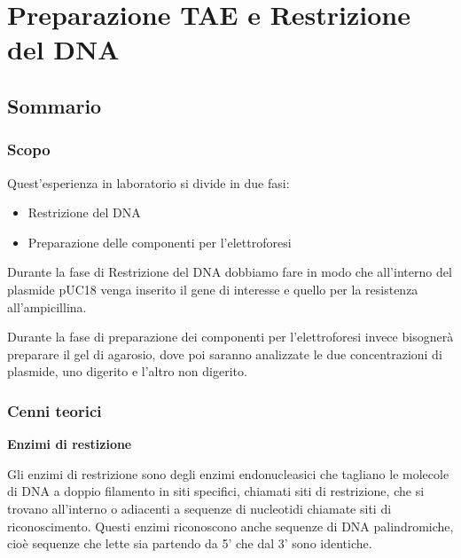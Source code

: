 \chapter{Preparazione TAE e Restrizione del DNA}

\vspace{0.6cm}


\section{Sommario}

\subsection{Scopo}

Quest'esperienza in laboratorio si divide in due fasi:

\begin{itemize}

	\item Restrizione del DNA

	\item Preparazione delle componenti per l'elettroforesi

\end{itemize}

Durante la fase di Restrizione del DNA dobbiamo fare in modo che all'interno del
plasmide pUC18 venga inserito il gene di interesse e quello per la resistenza all'ampicillina.
\vspace{0.3cm}

Durante la fase di preparazione dei componenti per l'elettroforesi invece bisognerà preparare il gel di
agarosio, dove poi saranno analizzate le due concentrazioni di plasmide, uno digerito e l'altro non digerito.

\subsection{Cenni teorici}

\textbf{Enzimi di restizione}
\vspace{0.3cm}



Gli enzimi di restrizione sono degli enzimi endonucleasici che tagliano le molecole
di DNA a doppio filamento in siti specifici, chiamati siti di restrizione,
che si trovano all'interno o adiacenti a sequenze di nucleotidi chiamate siti di riconoscimento.
Questi enzimi riconoscono anche sequenze di DNA palindromiche, cioè sequenze che lette sia
partendo da 5' che dal 3' sono identiche.

